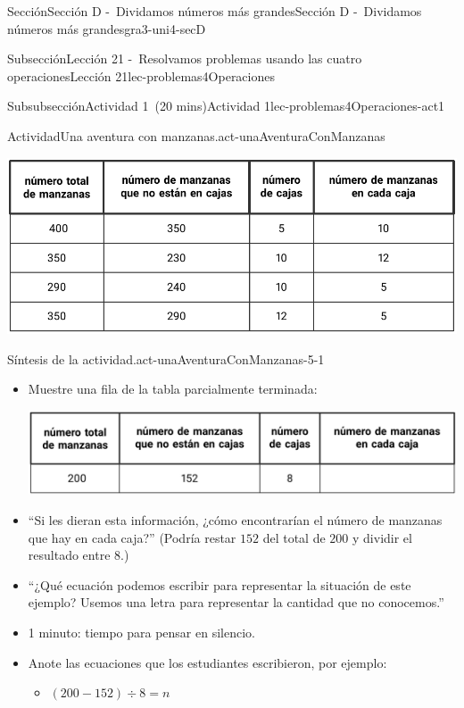 \documentclass[oneside,10pt,]{article}
\begin{document}
\begin{sectionptx}{Sección}{Sección D -~Dividamos números más grandes}{}{Sección D -~Dividamos números más grandes}{}{}{gra3-uni4-secD}
\begin{subsectionptx}{Subsección}{Lección 21 -~Resolvamos problemas usando las cuatro operaciones}{}{Lección 21}{}{}{lec-problemas4Operaciones}
\begin{subsubsectionptx}{Subsubsección}{Actividad 1~(20 mins)}{}{Actividad 1}{}{}{lec-problemas4Operaciones-act1}
\begin{activity}{Actividad}{Una aventura con manzanas.}{act-unaAventuraConManzanas}
\begin{image}{0}{1}{0}{}%
\includegraphics[width=\linewidth]{external/tikz-source/3-4-21-act1-sol-tab.pdf}
\end{image}%
\end{activity}%
%
%
\par
\begin{paragraphs}{Síntesis de la actividad.}{act-unaAventuraConManzanas-5-1}%
%
\begin{itemize}[label=\textbullet]
\item{}Muestre una fila de la tabla parcialmente terminada:%
\begin{image}{0}{1}{0}{}%
\includegraphics[width=\linewidth]{external/tikz-source/3-4-21-act1-syn-tab.pdf}
\end{image}%
\item{}``Si les dieran esta información, ¿cómo encontrarían el número de manzanas que hay en cada caja?'' (Podría restar \(152\) del total de \(200\) y dividir el resultado entre \(8\).)%
\item{}``¿Qué ecuación podemos escribir para representar la situación de este ejemplo? Usemos una letra para representar la cantidad que no conocemos.''%
\item{}1 minuto: tiempo para pensar en silencio.%
\item{}Anote las ecuaciones que los estudiantes escribieron, por ejemplo:%
%
\begin{itemize}[label=$\circ$]
\item{}\(\displaystyle (200 - 152) \div 8 = n\)%

\end{itemize}
\end{itemize}
\end{paragraphs}
\end{subsubsectionptx}
\end{subsectionptx}
\end{sectionptx}
\end{document}
